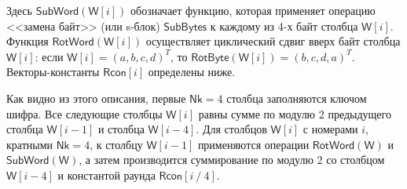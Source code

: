 Здесь $\mathsf{SubWord}(\mathsf{W}[i])$ обозначает функцию, которая применяет операцию <<замена байт>> (или s-блок) $\mathsf{SubBytes}$ к каждому из 4-х байт столбца $\mathsf{W}[i]$. Функция $\mathsf{RotWord}(\mathsf{W}[i])$  осуществляет циклический сдвиг вверх байт столбца $\mathsf{W}[i]$: если $\mathsf{W}[i] = (a, b, c, d)^T$, то $\mathsf{RotByte}(\mathsf{W}[i]) = (b, c, d, a)^T$. Векторы-константы $\mathsf{Rcon}[i]$ определены ниже.

Как видно из этого описания, первые $\mathsf{Nk} = 4$ столбца заполняются ключом шифра. Все следующие столбцы $\mathsf{W}[i]$ равны сумме по модулю 2 предыдущего столбца $\mathsf{W}[i-1]$ и столбца $\mathsf{W}[i-4]$. Для столбцов $\mathsf{W}[i]$ с номерами $i$, кратными $\mathsf{Nk} = 4$, к столбцу $\mathsf{W}[i-1]$ применяются операции $\mathsf{RotWord(W)}$ и $\mathsf{SubWord(W)}$, а затем производится суммирование по модулю 2 со столбцом $\mathsf{W}[i-4]$ и константой раунда $\mathsf{Rcon}[i ~/~ 4]$.


